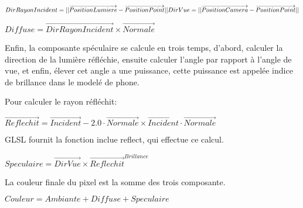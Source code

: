 \documentclass[11pt, a4paper, titlepage]{article}
\begin{document}
\begin{math}
DirRayonIncident = ||\overrightarrow{PositionLumiere} -  \overrightarrow{PositionPoint}||\\
DirVue = ||\overrightarrow{PositionCamera} -  \overrightarrow{PositionPoint}||
\end{math}

\begin{math}
Diffuse = \overrightarrow{DirRayonIncident} \times  \overrightarrow{Normale}
\end{math}

Enfin, la composante spéculaire se calcule en trois temps, d'abord, calculer
la direction de la lumière réfléchie, ensuite calculer l'angle par rapport à 
l'angle de vue, et enfin, élever cet angle a une puissance, cette puissance
est appelée indice de brillance dans le modelé de phone.

Pour calculer le rayon réfléchit:

\begin{math}
\overrightarrow{Reflechit} = \overrightarrow{Incident} - 2.0 \cdot \overrightarrow{Normale} \times \overrightarrow{Incident} \cdot \overrightarrow{Normale}
\end{math}

GLSL fournit la fonction inclue reflect, qui effectue ce calcul.

\begin{math}
Speculaire = \overrightarrow{DirVue} \times  \overrightarrow{Reflechit}^{Brillance}
\end{math}

La couleur finale du pixel est la somme des trois composante.

\begin{math}
Couleur = Ambiante + Diffuse + Speculaire
\end{math}
\end{document}
